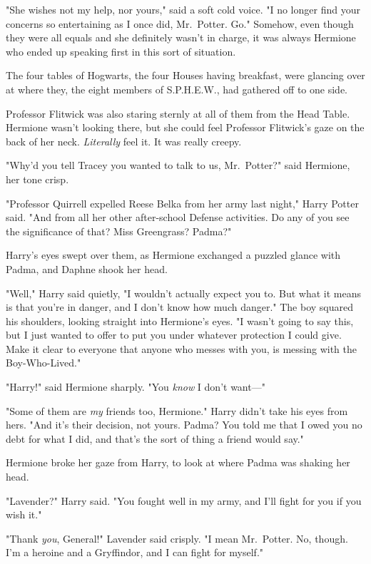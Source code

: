 "She wishes not my help, nor yours," said a soft cold voice. "I no longer find
your concerns so entertaining as I once did, Mr.~Potter. Go."
\sbreak
Somehow, even though they were all equals and she definitely wasn't in charge,
it was always Hermione who ended up speaking first in this sort of situation.

The four tables of Hogwarts, the four Houses having breakfast, were glancing
over at where they, the eight members of S.P.H.E.W., had gathered off to one
side.

Professor Flitwick was also staring sternly at all of them from the Head Table.
Hermione wasn't looking there, but she could feel Professor Flitwick's gaze on
the back of her neck. \emph{Literally} feel it. It was really creepy.

"Why'd you tell Tracey you wanted to talk to us, Mr.~Potter?" said Hermione,
her tone crisp.

"Professor Quirrell expelled Reese Belka from her army last night," Harry
Potter said. "And from all her other after-school Defense activities. Do any of
you see the significance of that? Miss Greengrass? Padma?"

Harry's eyes swept over them, as Hermione exchanged a puzzled glance with
Padma, and Daphne shook her head.

"Well," Harry said quietly, "I wouldn't actually expect you to. But what it
means is that you're in danger, and I don't know how much danger." The boy
squared his shoulders, looking straight into Hermione's eyes. "I wasn't going
to say this, but{\el} I just wanted to offer to put you under whatever
protection I could give. Make it clear to everyone that anyone who messes with
you, is messing with the Boy-Who-Lived."

"Harry!" said Hermione sharply. "You \emph{know} I don't want\mbox{---}"

"Some of them are \emph{my} friends too, Hermione." Harry didn't take his eyes
from hers. "And it's their decision, not yours. Padma? You told me that I owed
you no debt for what I did, and that's the sort of thing a friend would say."

Hermione broke her gaze from Harry, to look at where Padma was shaking her head.

"Lavender?" Harry said. "You fought well in my army, and I'll fight for you if
you wish it."

"Thank \emph{you}, General!" Lavender said crisply. "I mean Mr.~Potter. No,
though. I'm a heroine and a Gryffindor, and I can fight for myself."

